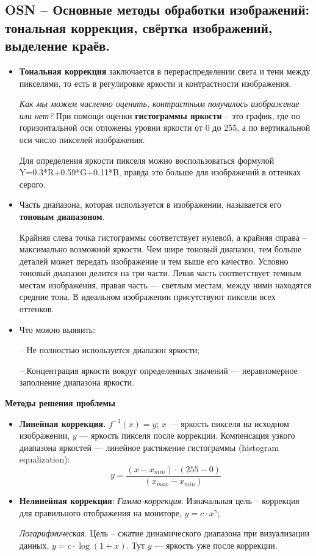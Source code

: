 \subsection{OSN -- Основные методы обработки изображений: тональная коррекция, свёртка изображений, выделение краёв.}


\begin{itemize}
\item \textbf{Тональная коррекция} заключается в перераспределении света и тени между пикселями, то есть в регулировке яркости и контрастности изображения. 

\textit{ Как мы можем численно оценить, контрастным получилось изображение или нет?} При помощи оценки \textbf{гистограммы яркости} -- это график, где по горизонтальной оси отложены уровни яркости от 0 до 255, а по вертикальной оси число пикселей изображения.

Для определения яркости пикселя можно воспользоваться формулой Y=0.3*R+0.59*G+0.11*B, правда это больше для изображений в оттенках серого.


\item Часть диапазона, которая используется в изображении, называется его \textbf{тоновым диапазоном}. 

Крайняя слева точка гистограммы соответствует нулевой, а крайняя справа -- максимально возможной яркости. Чем шире тоновый диапазон, тем больше деталей может передать изображение и тем выше его качество. Условно тоновый диапазон делится на три части. Левая часть соответствует темным местам изображения, правая часть --- светлым местам, между ними находятся средние тона. В идеальном изображении присутствуют пиксели всех оттенков.
\item Что можно выявить:
    \item[--] Не полностью используется диапазон яркости;
    \item[--] Концентрация яркости вокруг определенных значений --- неравномерное заполнение диапазона яркости.
\end{itemize}



\textbf{Методы решения проблемы}
\begin{itemize}
\item \textbf{Линейная коррекция.} 
$f^{-1}(x) = y$; $x$ --- яркость пикселя на исходном изображении, $y$ --- яркость пикселя после коррекции. Компенсация узкого диапазона яркостей --- линейное растяжение гистограммы (histogram equalization):
$$y = \frac{(x-x_{min})\cdot(255-0)}{(x_{max} - x_{min})}$$

\item \textbf{Нелинейная коррекция}:\newline
\textit{Гамма-коррекция}. Изначальная цель -- коррекция для правильного отображения на мониторе, $y = c \cdot x^\gamma$;

\textit{Логарифмическая}. Цель -- сжатие динамического диапазона при визуализации данных, $y = c \cdot \log(1 + x)$. Тут $y$ --- яркость уже после коррекции.
\end{itemize}

